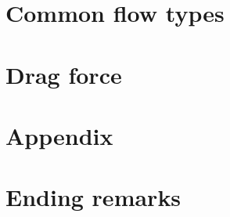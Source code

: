 \documentclass[12pt]{report}
\begin{document}


\chapter{Common flow types}



\chapter{Drag force}




%


%


%


\chapter*{Appendix}

\newpage
\thispagestyle{empty}

\chapter*{Ending remarks}
\end{document}
